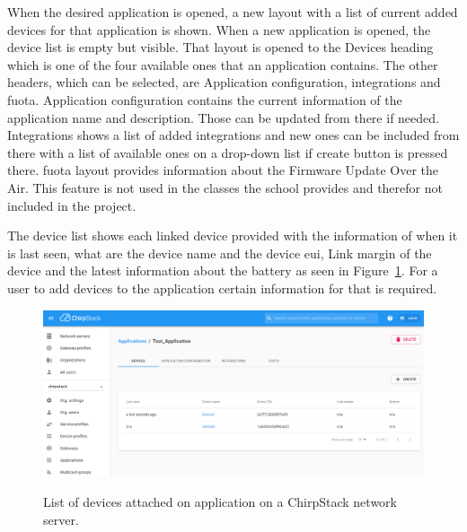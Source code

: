 When the desired application is opened, a new layout with a list of current added devices for that application is shown.
When a new application is opened, the device list is empty but visible.
That layout is opened to the Devices heading which is one of the four available ones that an application contains.
The other headers, which can be selected, are Application configuration, integrations and \gls{fuota}.
Application configuration contains the current information of the application name and description.
Those can be updated from there if needed.
Integrations shows a list of added integrations and new ones can be included from there with a list of available ones on a drop-down list if create button is pressed there.
\gls{fuota} layout provides information about the Firmware Update Over the Air.
This feature is not used in the classes the school provides and therefor not included in the project. 

The device list shows each linked device provided with the information of when it is last seen, what are the device name and the device \gls{eui}, Link margin of the device and the latest information about the battery as seen in Figure~\ref{fig:ChirpStack_application}.
For a user to add devices to the application certain information for that is required.

\begin{figure}[ht]
  \centering
  {\includegraphics[width=\textwidth]{illustration/ChirpStack_application.png}}
  \caption{List of devices attached on application on a ChirpStack network server.}
  \label{fig:ChirpStack_application}
\end{figure}

